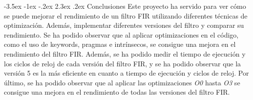 \documentclass[11pt]{report}
\makeatletter
\renewcommand\chapter{\@startsection{chapter}{0}{\z@}%
    {-3.5ex \@plus -1ex \@minus -.2ex}%
    {2.3ex \@plus.2ex}%
    {\normalfont\Large\bfseries}}
\makeatother
\begin{document}
\chapter{Conclusiones}
Este proyecto ha servido para ver cómo se puede mejorar el rendimiento de un filtro FIR utilizando diferentes técnicas de optimización. Además, implementar diferentes versiones del filtro y comparar su rendimiento. Se ha podido observar que al aplicar optimizaciones en el código, como el uso de keywords, pragmas e intrínsecos, se consigue una mejora en el rendimiento del filtro FIR. Además, se ha podido
medir el tiempo de ejecución y los ciclos de reloj de cada versión del filtro FIR, y se ha podido observar que la versión 5 es la más eficiente en cuanto a tiempo de ejecución y ciclos de reloj. Por último, se ha podido observar que al aplicar las optimizaciones \emph{O0} hasta \emph{O3} se 
consigue una mejora en el rendimiento de todas las versiones del filtro FIR.
\end{document}
